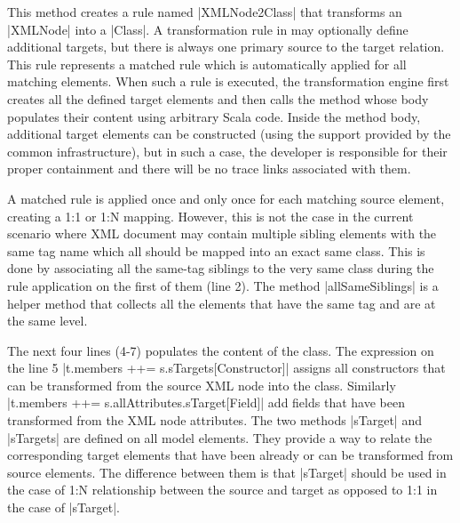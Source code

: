 This method creates a rule named \Scala|XMLNode2Class| that transforms an \Scala|XMLNode| into a \Scala|Class|.
A transformation rule in \SIGMA may optionally define additional targets, but there is always one primary source to the target relation.
This rule represents a matched rule which is automatically applied for all matching elements.
When such a rule is executed, the transformation engine first creates all the defined target elements and then calls the method whose body populates their content using arbitrary Scala code.
Inside the method body, additional target elements can be constructed (using the support provided by the common infrastructure), but in such a case, the developer is responsible for their proper containment and there will be no trace links associated with them.

A matched rule is applied once and only once for each matching source element, creating a 1:1 or 1:N mapping.
However, this is not the case in the current scenario where XML document may contain multiple sibling elements with the same tag name which all should be mapped into an exact same class.
This is done by associating all the same-tag siblings to the very same class during the rule application on the first of them (line 2).
The method \Scala|allSameSiblings| is a helper method that collects all the elements that have the same tag and are at the same level.

The next four lines (4-7) populates the content of the class.
The expression on the line 5 \Scala|t.members ++= s.sTargets[Constructor]| assigns all constructors that can be transformed from the source XML node into the class.
Similarly \Scala|t.members ++= s.allAttributes.sTarget[Field]| add fields that have been transformed from the XML node attributes.
The two methods \Scala|sTarget| and \Scala|sTargets| are defined on all model elements.
They provide a way to relate the corresponding target elements that have been already or can be transformed from source elements.
The difference between them is that \Scala|sTarget| should be used in the case of 1:N relationship between the source and target as opposed to 1:1 in the case of \Scala|sTarget|.

